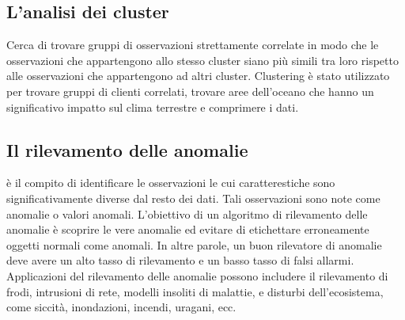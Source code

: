   \subsection{L'analisi dei cluster} 
    Cerca di trovare gruppi di osservazioni strettamente correlate in modo che
    le osservazioni che appartengono allo stesso cluster siano più simili tra loro
    rispetto alle osservazioni che appartengono ad altri cluster. Clustering è stato utilizzato per
    trovare gruppi di clienti correlati, trovare aree dell'oceano che hanno un significativo
    impatto sul clima terrestre e comprimere i dati.

  \subsection{Il rilevamento delle anomalie} 
    è il compito di identificare le osservazioni le cui caratterestiche sono significativamente diverse dal resto dei dati. 
    Tali osservazioni sono note come anomalie o valori anomali. L'obiettivo di un algoritmo di rilevamento delle anomalie
    è scoprire le vere anomalie ed evitare di etichettare erroneamente oggetti normali come anomali. In altre parole, un buon rilevatore di anomalie deve avere un alto
    tasso di rilevamento e un basso tasso di falsi allarmi. Applicazioni del rilevamento delle anomalie possono
    includere il rilevamento di frodi, intrusioni di rete, modelli insoliti di malattie,
    e disturbi dell'ecosistema, come siccità, inondazioni, incendi, uragani, ecc.
